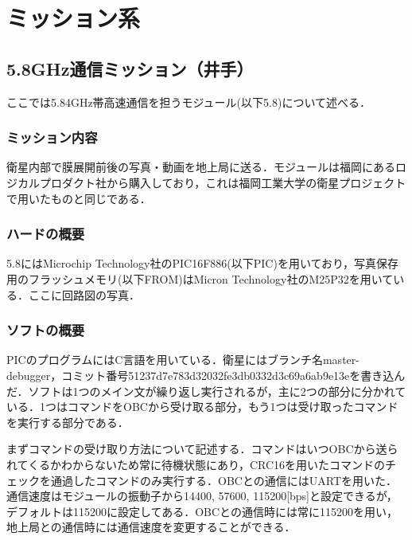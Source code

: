 \section{ミッション系}
\subsection{5.8GHz通信ミッション（井手）}
ここでは5.84GHz帯高速通信を担うモジュール(以下5.8)について述べる．
\subsubsection{ミッション内容}
衛星内部で膜展開前後の写真・動画を地上局に送る．モジュールは福岡にあるロジカルプロダクト社から購入しており，これは福岡工業大学の衛星プロジェクトで用いたものと同じである．

\subsubsection{ハードの概要}
5.8にはMicrochip Technology社のPIC16F886(以下PIC)を用いており，写真保存用のフラッシュメモリ(以下FROM)はMicron Technology社のM25P32を用いている．ここに回路図の写真．

\subsubsection{ソフトの概要}
PICのプログラムにはC言語を用いている．衛星にはブランチ名master-debugger，コミット番号51237d7e783d32032fe3db0332d3c69a6ab9e13eを書き込んだ．ソフトは1つのメイン文が繰り返し実行されるが，主に2つの部分に分かれている．1つはコマンドをOBCから受け取る部分，もう1つは受け取ったコマンドを実行する部分である．

まずコマンドの受け取り方法について記述する．コマンドはいつOBCから送られてくるかわからないため常に待機状態にあり，CRC16を用いたコマンドのチェックを通過したコマンドのみ実行する．OBCとの通信にはUARTを用いた．通信速度はモジュールの振動子から14400, 57600, 115200[bps]と設定できるが，デフォルトは115200に設定してある．OBCとの通信時には常に115200を用い，地上局との通信時には通信速度を変更することができる．
